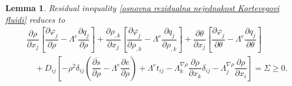 \documentclass[a4paper,fleqn]{cas-sc}
\newtheorem{lemma}{Lemma}[section]
\theoremstyle{definition}
\begin{document}
\begin{lemma} \label{Lema:Rezidualna nejednakost 2}
	Residual inequality \eqref{osnovna rezidualna nejednakost Kortevegovi fluidi} reduces to
	\begin{align} \label{rezidualna nejednakost 2 Kortevegovi fluidi}
		& \dfrac{\partial\rho}{\partial x_j} \left[\dfrac{\partial\varphi_j}{\partial\rho} 
		- \Lambda^e\dfrac{\partial q_j}{\partial\rho}\right] 
		+ \dfrac{\partial\rho_{,k}}{\partial x_j} \left[\dfrac{\partial\varphi_j}{\partial\rho_{,k}} 
		- \Lambda^e\dfrac{\partial q_j}{\partial\rho_{,k}} \right] 
		+ \dfrac{\partial\theta}{\partial x _j} \left[ \dfrac{\partial\varphi_j}{\partial\theta} 
		- \Lambda^e \dfrac{\partial q_j}{\partial\theta} \right]  
		\\
		& \quad + D_{ij} \left[ -\rho^2\delta_{ij} \left(\overline{\dfrac{\partial s}{\partial\rho}} 
		- \Lambda^e \dfrac{\partial e}{\partial\rho}\right) + \Lambda^et_{ij} 
		- \Lambda^{\nabla\rho}_k\dfrac{\partial\rho}{\partial x_k}\delta_{ij} 
		- \Lambda^{\nabla\rho}_j\dfrac{\partial\rho}{\partial x_i} \right] = \Sigma \geq 0. 
		\nonumber 
	\end{align}
\end{lemma}
\end{document}
